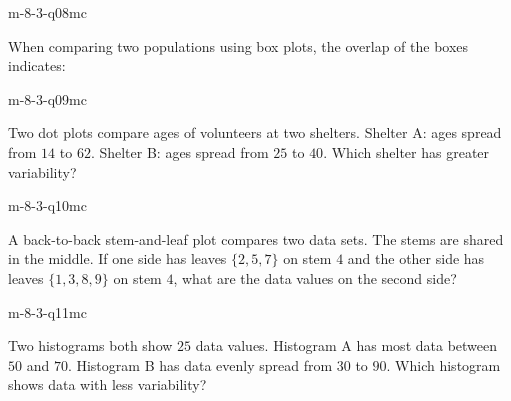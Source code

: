 \begin{practiceQuestion}{m-8-3-q08}{mc}
\begin{questionText}
When comparing two populations using box plots, the overlap of the boxes indicates:
\end{questionText}
\end{practiceQuestion}

\begin{practiceQuestion}{m-8-3-q09}{mc}
\begin{questionText}
Two dot plots compare ages of volunteers at two shelters. Shelter A: ages spread from $14$ to $62$. Shelter B: ages spread from $25$ to $40$. Which shelter has greater variability?
\end{questionText}
\end{practiceQuestion}

\begin{practiceQuestion}{m-8-3-q10}{mc}
\begin{questionText}
A back-to-back stem-and-leaf plot compares two data sets. The stems are shared in the middle. If one side has leaves $\{2, 5, 7\}$ on stem $4$ and the other side has leaves $\{1, 3, 8, 9\}$ on stem $4$, what are the data values on the second side?
\end{questionText}
\end{practiceQuestion}

\begin{practiceQuestion}{m-8-3-q11}{mc}
\begin{questionText}
Two histograms both show $25$ data values. Histogram A has most data between $50$ and $70$. Histogram B has data evenly spread from $30$ to $90$. Which histogram shows data with less variability?
\end{questionText}
\end{practiceQuestion}


